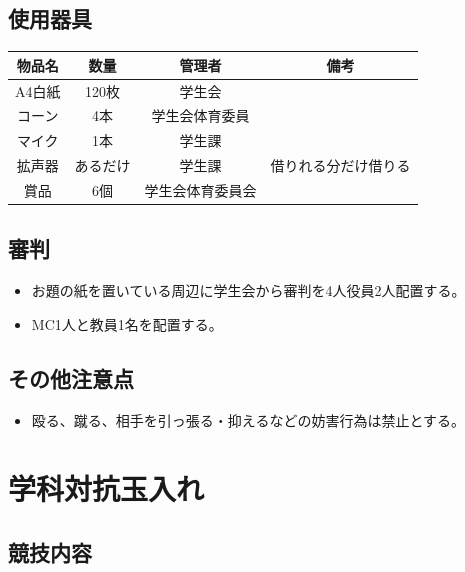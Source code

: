 \documentclass[titlepage]{jarticle}
\begin{document}
  \subsection{使用器具}
   \begin{table}[H]
    \begin{tabular}{cccc}
     物品名&数量&管理者 &備考\\ \hline\hline
A4白紙&120枚&学生会&\\
コーン&4本&学生会体育委員&\\
マイク&1本&学生課&\\
拡声器&あるだけ&学生課&借りれる分だけ借りる\\
賞品&6個&学生会体育委員会&\\
    \end{tabular}
   \end{table}
  \subsection{審判}
   \begin{itemize}
   \item お題の紙を置いている周辺に学生会から審判を4人役員2人配置する。 
   \item MC1人と教員1名を配置する。
   \end{itemize} 
  \subsection{その他注意点}
   \begin{itemize}
   \item 殴る、蹴る、相手を引っ張る・抑えるなどの妨害行為は禁止とする。 
   \end{itemize}
  \clearpage
 \section{学科対抗玉入れ}
  \subsection{競技内容}
\end{document}
